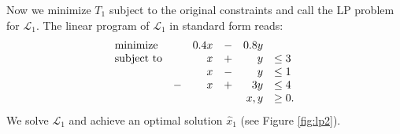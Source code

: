 \begin{comment}
\[
\begin{array}{rcl}
T_1 &=& -\left[
         \begin{array}{cc}
            1.2 & 0.6
         \end{array}
         \right]

         \left[
         \begin{array}{cc}
            1 & 0 \\ 0 & 1
         \end{array}
         \right]
         
         \left[
         \begin{array}{c}
             1.2 \\ [5pt] 0.6
         \end{array}
         \right]
         + 2
         \left[
         \begin{array}{cc}
            1.2 & 0.6
         \end{array}
         \right]
         
         \left[
         \begin{array}{cc}
            1 & 0 \\ 0 & 1
         \end{array}
         \right]
         
         \left[
         \begin{array}{c}
            x \\ y
         \end{array}
         \right] \\
         
     & & +
         \left[
         \begin{array}{cc}
            -2 & -2
         \end{array}
         \right]
         
         \left[
         \begin{array}{c}
            x \\ y
         \end{array}
         \right] \\ [15pt]
    &=& \displaystyle 0.4x - 0.8y - 1.8
\end{array}
\]
\end{comment}

Now we minimize $T_1$ subject to the original constraints and call the LP
problem for $\mathcal{L}_1$.
The linear program of $\mathcal{L}_1$ in standard form reads:
\[
\begin{array}{lcrcrl}
    \textrm{minimize}   & & 0.4 x &-& 0.8 y \\
    \textrm{subject to} & &     x &+&     y & \leq 3 \\
                        & &     x &-&     y & \leq 1 \\
                        &-&     x &+&   3 y & \leq 4 \\
     \multicolumn{5}{r}{x,y}                & \geq 0.
\end{array}
\]
We solve $\mathcal{L}_1$ and achieve an optimal solution $\hat{x}_1$
(see Figure \ref{fig:lp2}).

